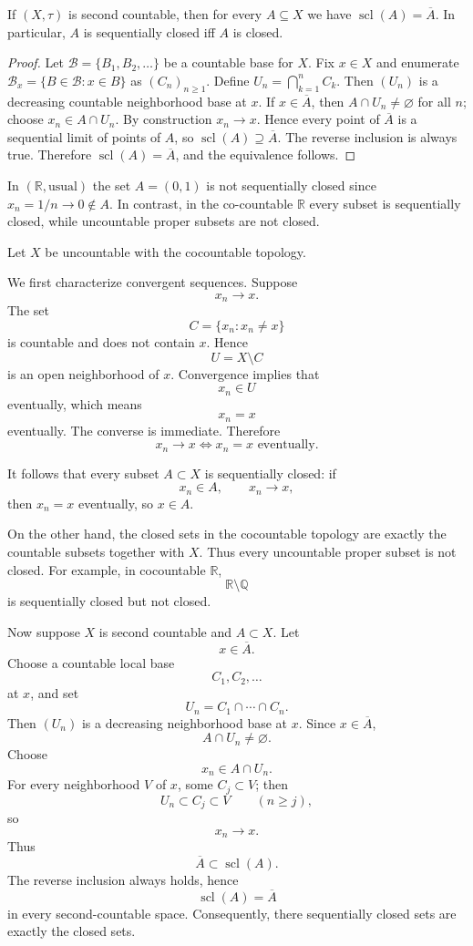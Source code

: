 \begin{problem}[CP-II-0332]
	\begin{proposition}
		If $(X,\tau)$ is second countable, then for every $A\subseteq X$ we have $\operatorname{scl}(A)=\overline{A}$. In particular, $A$ is sequentially closed iff $A$ is closed.
	\end{proposition}
	\begin{proof}
		Let $\mathcal{B}=\{B_1,B_2,\dots\}$ be a countable base for $X$. Fix $x\in X$ and enumerate $\mathcal{B}_x=\{B\in\mathcal{B}: x\in B\}$ as $(C_n)_{n\ge1}$.
		Define $U_n=\bigcap_{k=1}^n C_k$. Then $(U_n)$ is a decreasing countable neighborhood base at $x$.
		If $x\in\overline{A}$, then $A\cap U_n\neq\varnothing$ for all $n$; choose $x_n\in A\cap U_n$.
		By construction $x_n\to x$. Hence every point of $\overline{A}$ is a sequential limit of points of $A$, so $\operatorname{scl}(A)\supseteq\overline{A}$.
		The reverse inclusion is always true. Therefore $\operatorname{scl}(A)=\overline{A}$, and the equivalence follows.
	\end{proof}

	In $(\mathbb{R},\text{usual})$ the set $A=(0,1)$ is not sequentially closed since $x_n=1/n\to 0\notin A$.
	In contrast, in the co-countable $\mathbb{R}$ every subset is sequentially closed, while uncountable proper subsets are not closed.
\end{problem}

\begin{solution}
Let \(X\) be uncountable with the cocountable topology.

We first characterize convergent sequences. Suppose
\[
x_n\to x.
\]
The set
\[
C=\{x_n:x_n\neq x\}
\]
is countable and does not contain \(x\). Hence
\[
U=X\setminus C
\]
is an open neighborhood of \(x\). Convergence implies that
\[
x_n\in U
\]
eventually, which means
\[
x_n=x
\]
eventually. The converse is immediate. Therefore
\[
\boxed{
x_n\to x
\iff
x_n=x\text{ eventually}.
}
\]

It follows that every subset \(A\subset X\) is sequentially closed: if
\[
x_n\in A,
\qquad
x_n\to x,
\]
then \(x_n=x\) eventually, so \(x\in A\).

On the other hand, the closed sets in the cocountable topology are exactly the countable subsets together with \(X\). Thus every uncountable proper subset is not closed. For example, in cocountable \(\mathbb R\),
\[
\mathbb R\setminus\mathbb Q
\]
is sequentially closed but not closed.

Now suppose \(X\) is second countable and \(A\subset X\). Let
\[
x\in\overline A.
\]
Choose a countable local base
\[
C_1,C_2,\ldots
\]
at \(x\), and set
\[
U_n=C_1\cap\cdots\cap C_n.
\]
Then \((U_n)\) is a decreasing neighborhood base at \(x\). Since \(x\in\overline A\),
\[
A\cap U_n\neq\varnothing.
\]
Choose
\[
x_n\in A\cap U_n.
\]
For every neighborhood \(V\) of \(x\), some \(C_j\subset V\); then
\[
U_n\subset C_j\subset V
\qquad(n\ge j),
\]
so
\[
x_n\to x.
\]
Thus
\[
\overline A\subset\operatorname{scl}(A).
\]
The reverse inclusion always holds, hence
\[
\boxed{
\operatorname{scl}(A)=\overline A
}
\]
in every second-countable space. Consequently, there sequentially closed sets are exactly the closed sets.
\end{solution}


